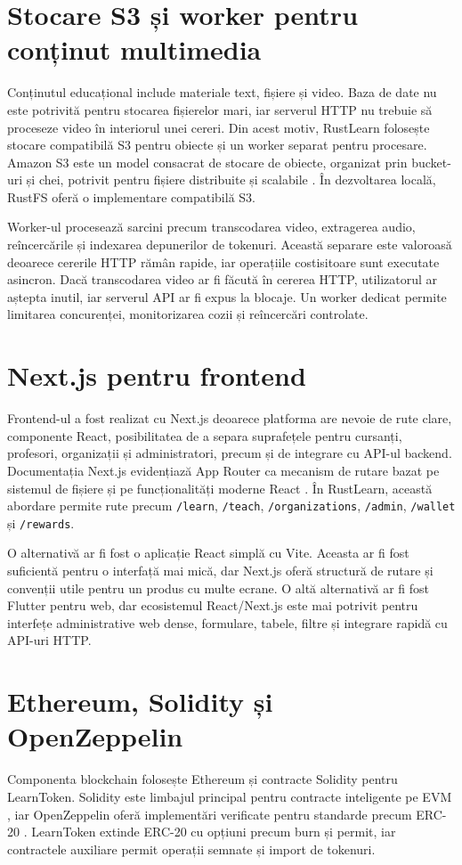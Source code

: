 \section{Stocare S3 și worker pentru conținut multimedia}
Conținutul educațional include materiale text, fișiere și video. Baza de date nu este potrivită pentru stocarea fișierelor mari, iar serverul HTTP nu trebuie să proceseze video în interiorul unei cereri. Din acest motiv, RustLearn folosește stocare compatibilă S3 pentru obiecte și un worker separat pentru procesare. Amazon S3 este un model consacrat de stocare de obiecte, organizat prin bucket-uri și chei, potrivit pentru fișiere distribuite și scalabile \cite{s3Docs}. În dezvoltarea locală, RustFS oferă o implementare compatibilă S3.

Worker-ul procesează sarcini precum transcodarea video, extragerea audio, reîncercările și indexarea depunerilor de tokenuri. Această separare este valoroasă deoarece cererile HTTP rămân rapide, iar operațiile costisitoare sunt executate asincron. Dacă transcodarea video ar fi făcută în cererea HTTP, utilizatorul ar aștepta inutil, iar serverul API ar fi expus la blocaje. Un worker dedicat permite limitarea concurenței, monitorizarea cozii și reîncercări controlate.

\section{Next.js pentru frontend}
Frontend-ul a fost realizat cu Next.js deoarece platforma are nevoie de rute clare, componente React, posibilitatea de a separa suprafețele pentru cursanți, profesori, organizații și administratori, precum și de integrare cu API-ul backend. Documentația Next.js evidențiază App Router ca mecanism de rutare bazat pe sistemul de fișiere și pe funcționalități moderne React \cite{nextAppDocs}. În RustLearn, această abordare permite rute precum \texttt{/learn}, \texttt{/teach}, \texttt{/organizations}, \texttt{/admin}, \texttt{/wallet} și \texttt{/rewards}.

O alternativă ar fi fost o aplicație React simplă cu Vite. Aceasta ar fi fost suficientă pentru o interfață mai mică, dar Next.js oferă structură de rutare și convenții utile pentru un produs cu multe ecrane. O altă alternativă ar fi fost Flutter pentru web, dar ecosistemul React/Next.js este mai potrivit pentru interfețe administrative web dense, formulare, tabele, filtre și integrare rapidă cu API-uri HTTP.

\section{Ethereum, Solidity și OpenZeppelin}
Componenta blockchain folosește Ethereum și contracte Solidity pentru LearnToken. Solidity este limbajul principal pentru contracte inteligente pe EVM \cite{solidityDocs}, iar OpenZeppelin oferă implementări verificate pentru standarde precum ERC-20 \cite{openzeppelinERC20}. LearnToken extinde ERC-20 cu opțiuni precum burn și permit, iar contractele auxiliare permit operații semnate și import de tokenuri.

